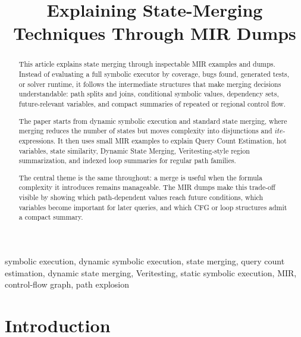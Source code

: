 \documentclass[conference]{IEEEtran}
\newcommand{\ite}{\mathit{ite}}
\begin{document}
\title{Explaining State-Merging Techniques Through MIR Dumps}

\author{
}

\maketitle

\begin{abstract}
This article explains state merging through inspectable MIR examples and dumps.
Instead of evaluating a full symbolic executor by coverage, bugs found,
generated tests, or solver runtime, it follows the intermediate structures that
make merging decisions understandable: path splits and joins, conditional
symbolic values, dependency sets, future-relevant variables, and compact
summaries of repeated or regional control flow.

The paper starts from dynamic symbolic execution and standard state merging,
where merging reduces the number of states but moves complexity into
disjunctions and \(\ite\)-expressions. It then uses small MIR examples to
explain Query Count Estimation, hot variables, state similarity, Dynamic State
Merging, Veritesting-style region summarization, and indexed loop summaries for
regular path families.

The central theme is the same throughout: a merge is useful when the
formula complexity it introduces remains manageable. The MIR dumps make this
trade-off visible by showing which path-dependent values reach future
conditions, which variables become important for later queries, and which CFG
or loop structures admit a compact summary.
\end{abstract}


\begin{IEEEkeywords}
symbolic execution, dynamic symbolic execution, state merging, query count estimation, dynamic state merging, Veritesting, static symbolic execution, MIR, control-flow graph, path explosion
\end{IEEEkeywords}

\section{Introduction}
\label{sec:introduction}
\end{document}
